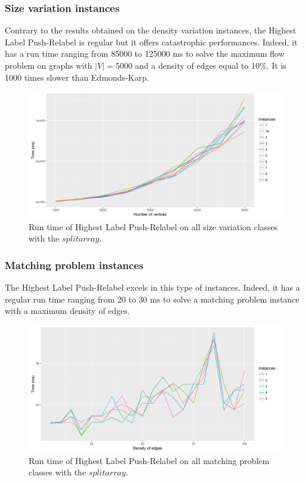 \subsubsection{Size variation instances}
Contrary to the results obtained on the density variation instances, the Highest Label Push-Relabel is regular but it offers catastrophic performances. Indeed, it has a run time ranging from 85000 to 125000 ms to solve the maximum flow problem on graphs with $|V|=5000$ and a density of edges equal to 10\%. It is 1000 times slower than Edmonds-Karp.
\begin{figure}[H]
\begin{center}
\includegraphics[scale=0.44]{images/results/HLPRmean.png}
\caption{Run time of Highest Label Push-Relabel on all size variation classes with the $split array$.}
\label{fig:HLPRmean}
\end{center}
\end{figure}
\subsubsection{Matching problem instances}
The Highest Label Push-Relabel excels in this type of instances. Indeed, it has a regular run time ranging from 20 to 30 ms to solve a matching problem instance with a maximum density of edges.
\begin{figure}[H]
\begin{center}
\includegraphics[scale=0.44]{images/results/prmatching.png}
\caption{Run time of Highest Label Push-Relabel on all matching problem classes with the $split array$.}
\label{fig:prmatching}
\end{center}
\end{figure}

